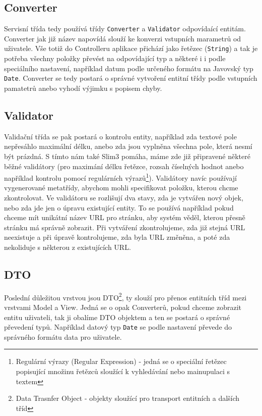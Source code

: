 \subsection{Converter}
Servisní třída tedy používá třídy \verb|Converter| a \verb|Validator| odpovídaící entitám. Converter jak již název napovídá slouží ke konverzi vstupních marametrů od uživatele. Vše totiž do Controlleru aplikace přichází jako řetězec (\verb|String|) a tak je potřeba všechny položky převést na odpovídající typ a některé i i podle speciálního nastavení, například datum podle určeného formátu na Javovský typ \verb|Date|. Converter se tedy postará o správné vytvoření entitní třídy podle vstupních pamatetrů anebo vyhodí výjimku s popisem chyby. 

\subsection{Validator}
Validační třída se pak postará o kontrolu entity, například zda textové pole nepřesáhlo maximální délku, anebo zda jsou vyplněna všechna pole, která nesmí být prázdná. S tímto nám také Slim3 pomáha, máme zde již připravené některé běžné validátory (pro maximání délku řetězce, rozsah číselných hodnot anebo například kontrolu pomocí regulárních výrazů\footnote{Regulární výrazy (Regular Expression) - jedná se o speciální řetězec popisující množinu řetězců sloužící k vyhledávání nebo mainupulaci s textem}). Validátory navíc používají vygenerované metatřídy, abychom mohli specifikovat položku, kterou chcme zkontrolovat. Ve validátoru se rozlišují dva stavy, zda je vytvářen nový objek, nebo zda jde jen o úpravu existující entity. To se používá například pokud chceme mít unikátní název URL pro stránku, aby systém věděl, kterou přesně stránku má správně zobrazit. Při vytváření zkontrolujeme, zda již stejná URL neexistuje a při úpravě kontrolujeme, zda byla URL změněna, a poté zda nekoliduje s některou z existujících URL. 

\subsection{DTO}
Poslední důležitou vrstvou jsou DTO\footnote{Data Trasnfer Object - objekty sloužící pro transport entitních a dalších tříd}, ty slouží pro přenos entitních tříd mezi vrstvami Model a View. Jedná se o opak Converterů, pokud chceme zobrazit entitu uživateli, tak ji obalíme DTO objektem a ten se postará o správné převedení typů. Například datový typ \verb|Date| se podle nastavení převede do správného formátu data pro uživatele. 

